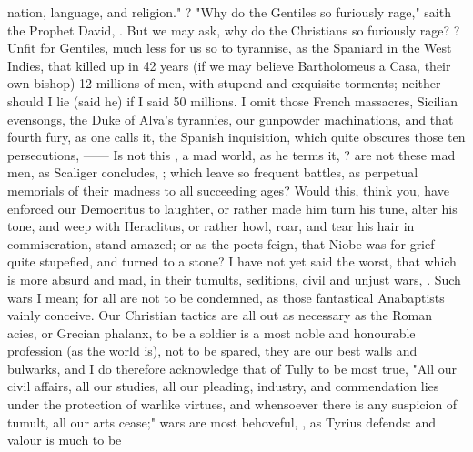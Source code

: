 nation, language, and religion." ?
"Why do the Gentiles so furiously rage," saith the Prophet David,
. But we may ask, why do the Christians so furiously
rage? ?
Unfit for Gentiles, much less for us so to tyrannise, as the Spaniard in the
West Indies, that killed up in 42 years (if we may believe
Bartholomeus a Casa, their own bishop) 12 millions of men,
with stupend and exquisite torments; neither should I lie (said he) if I said
50 millions. I omit those French massacres, Sicilian evensongs,
the Duke of Alva's tyrannies, our gunpowder machinations,
and that fourth fury, as one calls it, the Spanish
inquisition, which quite obscures those ten persecutions,
------  Is not this
, a mad world, as he terms it,
? are not these mad men, as Scaliger
concludes, ; which leave so frequent battles, as
perpetual memorials of their madness to all succeeding ages? Would this, think
you, have enforced our Democritus to laughter, or rather made him turn his
tune, alter his tone, and weep with Heraclitus, or rather
howl, roar, and tear his hair in commiseration, stand
amazed; or as the poets feign, that Niobe was for grief quite stupefied, and
turned to a stone? I have not yet said the worst, that which is more absurd and
mad, in their tumults, seditions, civil and unjust wars,
.
Such wars I mean; for all are not to be condemned, as those fantastical
Anabaptists vainly conceive. Our Christian tactics are all out as necessary as
the Roman acies, or Grecian phalanx, to be a soldier is a most noble and
honourable profession (as the world is), not to be spared, they are our best
walls and bulwarks, and I do therefore acknowledge that of
Tully to be most true, "All our civil affairs, all our
studies, all our pleading, industry, and commendation lies under the protection
of warlike virtues, and whensoever there is any suspicion of tumult, all our
arts cease;" wars are most behoveful, , as Tyrius defends: and valour is much to be
